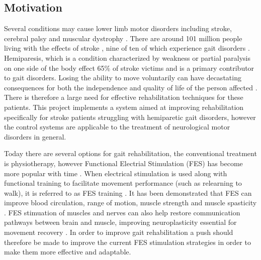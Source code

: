 



\subsection{Motivation}

Several conditions may cause lower limb motor disorders including stroke, cerebral palsy and muscular dystrophy \cite{hayami_development_2022}. There are around 101 million people living with the effects of stroke \cite{noauthor_key_nodate}, nine of ten of which experience gait disorders \cite{schaechter_motor_2004}. Hemiparesis, which is a condition characterized by weakness or partial paralysis on one side of the body effect 65\% of stroke victims \cite{wist_muscle_2016} and is a primary contributor to gait disorders. Losing the ability to move voluntarily can have decastating consequences for both the independence and quality of life of the person affected \cite{marquez-chin_functional_2020}. There is therefore a large need for effective rehabilitation techniques for these patients. This project implements a system aimed at improving rehabilitation specifically for stroke patients struggling with hemiparetic gait disorders, however the control systems are applicable to the treatment of neurological motor disorders in general.

Today there are several options for gait rehabilitation, the conventional treatment is physiotherapy, however Functional Electrial Stimulation (FES) has become more popular with time \cite{muller_adaptive_2020}. When electrical stimulation is used along with functional training to facilitate movement performance (such as relearning to walk), it is referred to as FES training \cite{hayami_development_2022}. It has been demonstrated that FES can improve blood circulation, range of motion, muscle strength and muscle spasticity \cite{luo_review_2020}. FES stimuation of muscles and nerves can also help restore communication pathways between brain and muscle, improving neuroplasticity essential for movement recovery \cite{marquez-chin_functional_2020}. In order to improve gait rehabilitation a push should therefore be made to improve the current FES stimulation strategies in order to make them more effective and adaptable.

